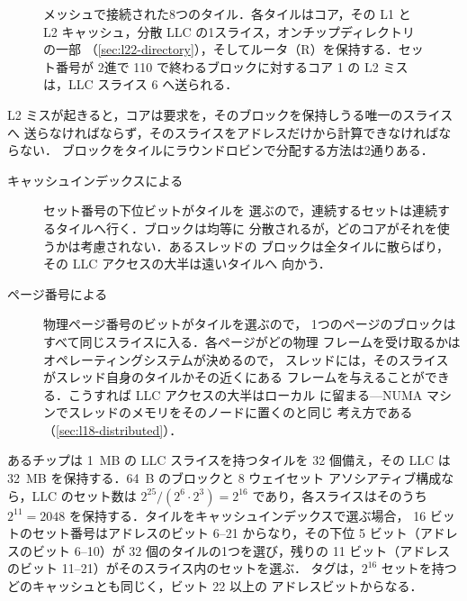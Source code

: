 \documentclass[../main.tex]{subfiles}
\begin{document}
\begin{figure}[htbp]
  \centering
  
  \caption{メッシュで接続された8つのタイル．各タイルはコア，その L1 と L2
    キャッシュ，分散 LLC の1スライス，オンチップディレクトリの一部
    （\cref{sec:l22-directory}），そしてルータ（R）を保持する．セット番号が
    2進で 110 で終わるブロックに対するコア 1 の L2 ミスは，LLC スライス 6
    へ送られる．}
  \label{fig:l22-llc}
\end{figure}

L2 ミスが起きると，コアは要求を，そのブロックを保持しうる唯一のスライスへ
送らなければならず，そのスライスをアドレスだけから計算できなければならない．
ブロックをタイルにラウンドロビンで分配する方法は2通りある．
\begin{description}
  \item[キャッシュインデックスによる] セット番号の下位ビットがタイルを
    選ぶので，連続するセットは連続するタイルへ行く．ブロックは均等に
    分散されるが，どのコアがそれを使うかは考慮されない．あるスレッドの
    ブロックは全タイルに散らばり，その LLC アクセスの大半は遠いタイルへ
    向かう．
  \item[ページ番号による] 物理ページ番号のビットがタイルを選ぶので，
    1つのページのブロックはすべて同じスライスに入る．各ページがどの物理
    フレームを受け取るかはオペレーティングシステムが決めるので，
    スレッドには，そのスライスがスレッド自身のタイルかその近くにある
    フレームを与えることができる．こうすれば LLC アクセスの大半はローカル
    に留まる---NUMA マシンでスレッドのメモリをそのノードに置くのと同じ
    考え方である（\cref{sec:l18-distributed}）．
\end{description}

\begin{example}
  \label{ex:l22-llc}
  あるチップは \SI{1}{MB} の LLC スライスを持つタイルを 32 個備え，その
  LLC は \SI{32}{MB} を保持する．\SI{64}{B} のブロックと 8 ウェイセット
  アソシアティブ構成なら，LLC のセット数は
  $2^{25}/(2^{6}\cdot 2^{3})=2^{16}$ であり，各スライスはそのうち
  $2^{11}=2048$ を保持する．タイルをキャッシュインデックスで選ぶ場合，
  16 ビットのセット番号はアドレスのビット 6--21 からなり，その下位 5
  ビット（アドレスのビット 6--10）が 32 個のタイルの1つを選び，残りの
  11 ビット（アドレスのビット 11--21）がそのスライス内のセットを選ぶ．
  タグは，$2^{16}$ セットを持つどのキャッシュとも同じく，ビット 22 以上の
  アドレスビットからなる．
\end{example}
\end{document}
